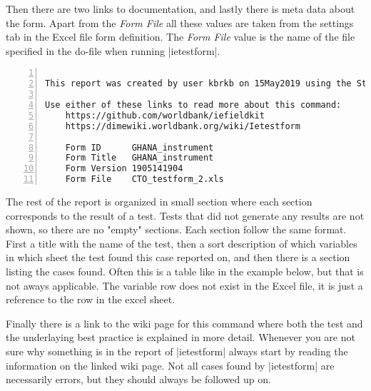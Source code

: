 \documentclass{tufte-handout}
\begin{document}
	Then there are two links to documentation, and lastly there is meta data about the form. Apart from the \textit{Form File} all these values are taken from the settings tab in the Excel file form definition. The \textit{Form File} value is the name of the file specified in the do-file when running |ietestform|.

	\begin{minipage}{1.5\textwidth}
		\vspace{.5cm}
	 	\begin{Verbatim}[frame=lines,
						numbers=left,
						label=ietestform-header,
						samepage=true,
						baselinestretch=0.75]

This report was created by user kbrkb on 15May2019 using the Stata command ietestform

Use either of these links to read more about this command:
	https://github.com/worldbank/iefieldkit
	https://dimewiki.worldbank.org/wiki/Ietestform

	Form ID      GHANA_instrument
	Form Title   GHANA_instrument
	Form Version 1905141904
	Form File    CTO_testform_2.xls
		\end{Verbatim}
		\vspace{.5cm}
 	\end{minipage}
 
	\noindent The rest of the report is organized in small section where each section corresponds to the result of a test. Tests that did not generate any results are not shown, so there are no "empty" sections. Each section follow the same format. First a title with the name of the test, then a sort description of which variables in which sheet the test found this case reported on, and then there is a section listing the cases found. Often this is a table like in the example below, but that is not aways applicable. The variable row does not exist in the Excel file, it is just a reference to the row in the excel sheet.
	
	Finally there is a link to the wiki page for this command where both the test and the underlaying best practice is explained in more detail. Whenever you are not sure why something is in the report of |ietestform| always start by reading the information on the linked wiki page. Not all cases found by |ietestform| are necessarily errors, but they should always be followed up on.
 	
\end{document}
